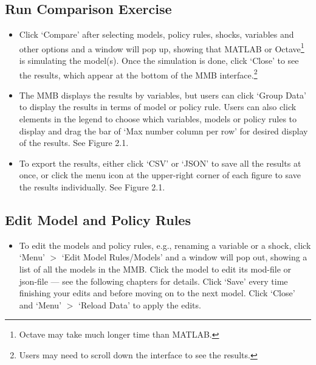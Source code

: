 \documentclass[10pt,a4paper]{article}
\begin{document}
\subsection{Run Comparison Exercise}
\medskip

\begin{itemize}
\item Click ‘Compare’ after selecting models, policy rules, shocks, variables and other options and a window will pop up, showing that MATLAB or Octave\footnote{Octave may take much longer time than MATLAB.} is simulating the model(s). Once the simulation is done, click ‘Close’ to see the results, which appear at the bottom of the MMB interface.\footnote{Users may need to scroll down the interface to see the results.}

\item The MMB displays the results by variables, but users can click ‘Group Data’ to display the results in terms of model or policy rule. Users can also click elements in the legend to choose which variables, models or policy rules to display and drag the bar of ‘Max number column per row’ for desired display of the results. See Figure 2.1.

\item To export the results, either click ‘CSV’ or ‘JSON’ to save all the results at once, or click the menu icon at the upper-right corner of each figure to save the results individually. See Figure 2.1.
\end{itemize}

\subsection{Edit Model and Policy Rules}
\medskip

\begin{itemize}
\item To edit the models and policy rules, e.g., renaming a variable or a shock, click ‘Menu’ $>$ ‘Edit Model Rules/Models’ and a window will pop out, showing a list of all the models in the MMB. Click the model to edit its mod-file or json-file — see the following chapters for details. Click ‘Save’ every time finishing your edits and before moving on to the next model. Click ‘Close’ and ‘Menu’ $>$ ‘Reload Data’ to apply the edits.
\end{itemize}
\pagebreak
\end{document}
